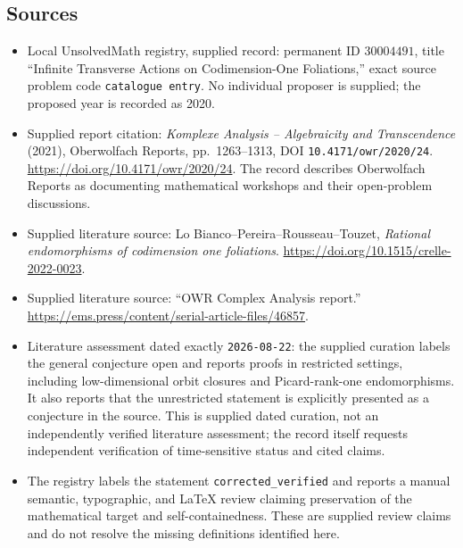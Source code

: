 \documentclass[11pt]{article}
\begin{document}
\subsection{Sources}
\begin{itemize}
\item Local UnsolvedMath registry, supplied record: permanent ID \(30004491\), title ``Infinite Transverse Actions on Codimension-One Foliations,'' exact source problem code \texttt{catalogue entry}. No individual proposer is supplied; the proposed year is recorded as 2020.
\item Supplied report citation: \emph{Komplexe Analysis -- Algebraicity and Transcendence} (2021), Oberwolfach Reports, pp.~1263--1313, DOI \texttt{10.4171/owr/2020/24}. \url{https://doi.org/10.4171/owr/2020/24}. The record describes Oberwolfach Reports as documenting mathematical workshops and their open-problem discussions.
\item Supplied literature source: Lo Bianco--Pereira--Rousseau--Touzet, \emph{Rational endomorphisms of codimension one foliations}. \url{https://doi.org/10.1515/crelle-2022-0023}.
\item Supplied literature source: ``OWR Complex Analysis report.'' \url{https://ems.press/content/serial-article-files/46857}.
\item Literature assessment dated exactly \texttt{2026-08-22}: the supplied curation labels the general conjecture open and reports proofs in restricted settings, including low-dimensional orbit closures and Picard-rank-one endomorphisms. It also reports that the unrestricted statement is explicitly presented as a conjecture in the source. This is supplied dated curation, not an independently verified literature assessment; the record itself requests independent verification of time-sensitive status and cited claims.
\item The registry labels the statement \texttt{corrected\_verified} and reports a manual semantic, typographic, and LaTeX review claiming preservation of the mathematical target and self-containedness. These are supplied review claims and do not resolve the missing definitions identified here.
\end{itemize}
\end{document}
